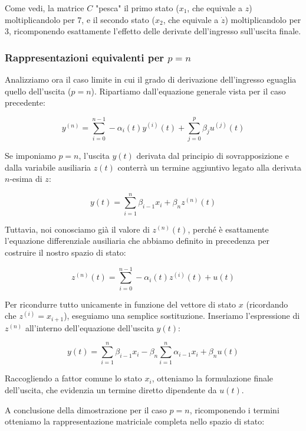 \documentclass[a4paper,12pt]{article}
\begin{document}
	Come vedi, la matrice $C$ "pesca" il primo stato ($x_1$, che equivale a $z$) moltiplicandolo per 7, e il secondo stato ($x_2$, che equivale a $\dot{z}$) moltiplicandolo per 3, ricomponendo esattamente l'effetto delle derivate dell'ingresso sull'uscita finale.
	\subsubsection{Rappresentazioni equivalenti per $p = n$}
	
	
	Analizziamo ora il caso limite in cui il grado di derivazione dell'ingresso eguaglia quello dell'uscita ($p = n$). Ripartiamo dall'equazione generale vista per il caso precedente:
	
	\[
	y^{(n)} = \sum_{i=0}^{n-1} -\alpha_i(t)y^{(i)}(t) + \sum_{j=0}^{p} \beta_j u^{(j)}(t)
	\]
	
	Se imponiamo $p = n$, l'uscita $y(t)$ derivata dal principio di sovrapposizione e dalla variabile ausiliaria $z(t)$ conterrà un termine aggiuntivo legato alla derivata $n$-esima di $z$:
	
	\[
	y(t) = \sum_{i=1}^{n} \beta_{i-1}x_i + \beta_n z^{(n)}(t)
	\]
	
	Tuttavia, noi conosciamo già il valore di $z^{(n)}(t)$, perché è esattamente l'equazione differenziale ausiliaria che abbiamo definito in precedenza per costruire il nostro spazio di stato:
	
	\[
	z^{(n)}(t) = \sum_{i=0}^{n-1} -\alpha_i(t)z^{(i)}(t) + u(t)
	\]
	
	Per ricondurre tutto unicamente in funzione del vettore di stato $x$ (ricordando che $z^{(i)} = x_{i+1}$), eseguiamo una semplice sostituzione. Inseriamo l'espressione di $z^{(n)}$ all'interno dell'equazione dell'uscita $y(t)$:
	
	\[
	y(t) = \sum_{i=1}^{n} \beta_{i-1}x_i - \beta_n \sum_{i=1}^{n} \alpha_{i-1}x_i + \beta_n u(t)
	\]
	
	Raccogliendo a fattor comune lo stato $x_i$, otteniamo la formulazione finale dell'uscita, che evidenzia un termine diretto dipendente da $u(t)$.
	
	\vspace{0.5cm}
	A conclusione della dimostrazione per il caso $p=n$, ricomponendo i termini otteniamo la rappresentazione matriciale completa nello spazio di stato:
	
\end{document}
